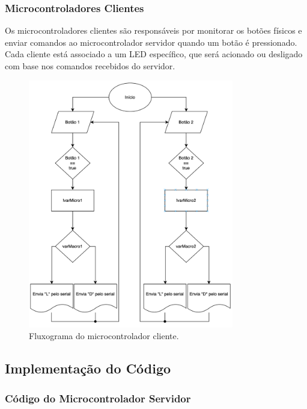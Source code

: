 \documentclass[12pt, a4paper]{article}
\begin{document}
\subsubsection{Microcontroladores Clientes}
Os microcontroladores clientes são responsáveis por monitorar os botões físicos e enviar comandos ao microcontrolador servidor quando um botão é pressionado. Cada cliente está associado a um LED específico, que será acionado ou desligado com base nos comandos recebidos do servidor.
\begin{figure}[H]
	\centering
	\includegraphics[width=0.8\textwidth]{fluxograma_cliente.png}
	\caption{Fluxograma do microcontrolador cliente.}
\end{figure}
\label{fig:fluxograma_cliente}
\subsection{Implementação do Código}
\subsubsection{Código do Microcontrolador Servidor}
\begin{mybox}[label={lst:codigo_servidor},title={Código do Microcontrolador Servidor}]{}
	\inputminted[fontsize=\footnotesize,breaklines,linenos]{cpp}{codigo_servidor.ino}
\end{mybox}
\end{document}

